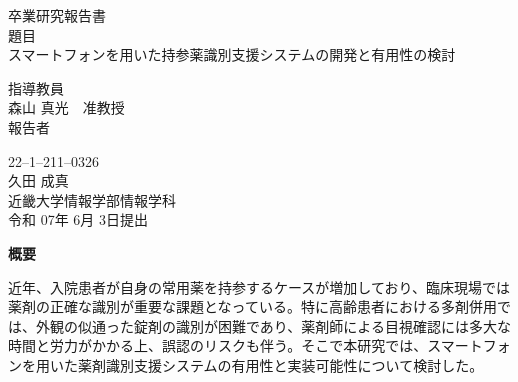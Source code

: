 \documentclass[12pt]{article}
\begin{document}
\pagestyle{empty}

\begin{center}
\vspace*{1cm}
\large
{\LARGE 卒業研究報告書}\\
\vspace*{0.8cm}
題目\\
\vspace*{1cm}
{\Huge {スマートフォンを用いた持参薬識別支援システムの開発と有用性の検討}}\\
\vspace{3mm}

\vspace*{3cm}
指導教員\\
\vspace*{0.3cm}
{\LARGE 森山 真光　准教授}\\
\vspace*{3cm}
報告者\\
\vspace*{0.3cm}

{22--1--211--0326}\\
\vspace*{0.3cm}
{\Huge 久田 成真}\\
\vspace*{0.5cm}
近畿大学情報学部情報学科\\
\vspace*{2cm}
令和 07年 6月 3日提出\\
\end{center}

\newpage
\normalsize


\clearpage
\begin{center}
{\bf \Large 概要}
\end{center} 

近年、入院患者が自身の常用薬を持参するケースが増加しており、臨床現場では薬剤の正確な識別が重要な課題となっている。特に高齢患者における多剤併用では、外観の似通った錠剤の識別が困難であり、薬剤師による目視確認には多大な時間と労力がかかる上、誤認のリスクも伴う。そこで本研究では、スマートフォンを用いた薬剤識別支援システムの有用性と実装可能性について検討した。
\end{document}
